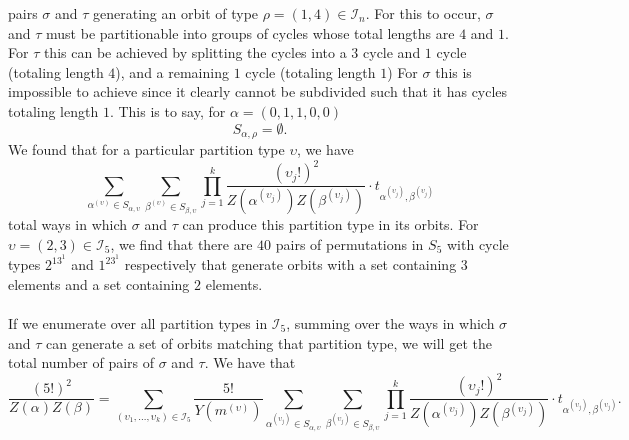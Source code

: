 pairs $\sigma$ and $\tau$ generating an orbit of type $\rho =
(1,4)\in\mathcal{I}_n$. For this to occur, $\sigma$ and $\tau$
must be partitionable into groups of cycles whose total lengths are
$4$ and $1$. For $\tau$ this can be achieved by splitting the cycles
into a $3$ cycle and $1$ cycle (totaling length $4$), and a remaining
$1$ cycle (totaling length $1$) For $\sigma$ this is impossible to
achieve since it clearly cannot be subdivided such that it has cycles
totaling length $1$. This is to
say, for $\alpha = (0,1,1,0,0)$
\[
  S_{\alpha,\rho} = \emptyset.
\]
We found that for a particular partition type $\upsilon$, we have
\[
  \sum_{\alpha^{(\upsilon)}\in
  S_{\alpha,\upsilon}}\sum_{\beta^{(\upsilon)}\in
  S_{\beta,\upsilon}}\prod_{j=1}^k
  {\frac{(\upsilon_j!)^2}{Z(\alpha^{(\upsilon_j)})Z(\beta^{(\upsilon_j)})}}\cdot
t_{\alpha^{(\upsilon_j)},\beta^{(\upsilon_j)}}\]
total ways in which $\sigma$ and $\tau$ can produce this partition type in
its orbits.
For $\upsilon = (2,3)\in\mathcal{I}_5$, we find that there are $40$
pairs of permutations in $S_5$ with cycle
types $2^13^1$ and $1^23^1$ respectively that generate orbits with a
set containing $3$ elements and a set containing $2$ elements.
\\\\If we enumerate over all partition types in $\mathcal{I}_5$, summing over
the ways in which $\sigma$ and $\tau$ can generate a set of orbits
matching that partition type, we will get the total number of pairs of
$\sigma$ and $\tau$. We have that
\[
  \frac{(5!)^2}{Z(\alpha)Z(\beta)} =
  \sum_{(\upsilon_1,\dots,\upsilon_k)\in\mathcal{I}_5}\frac{5!}{Y(m^{(\upsilon)})}\sum_{\alpha^{(\upsilon_j)}\in
  S_{\alpha,\upsilon}}\sum_{\beta^{(\upsilon_j)}\in
  S_{\beta,\upsilon}}\prod_{j=1}^k
  {\frac{(\upsilon_j!)^2}{Z(\alpha^{(\upsilon_j)})Z(\beta^{(\upsilon_j)})}}\cdot
  t_{\alpha^{(\upsilon_j)},\beta^{(\upsilon_j)}}.
\]
